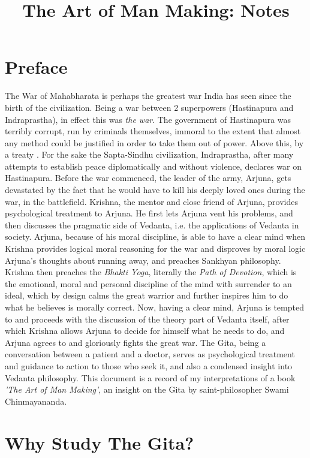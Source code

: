 \documentclass{article}
\title{The Art of Man Making: Notes}
\author{ }
\newcommand{\tit}[1]{\textit{#1}}
\begin{document}
\maketitle
\newpage \section*{Preface}
The War of Mahabharata is perhaps the greatest war India has seen since the birth of the civilization. Being a war between 2 superpowers (Hastinapura and Indraprastha), in effect this was \tit{the war}. The government of Hastinapura was terribly corrupt, run by criminals themselves, immoral to the extent that almost any method could be justified in order to take them out of power. Above this, by a treaty . For the sake the Sapta-Sindhu civilization, Indraprastha, after many attempts to establish peace diplomatically and without violence, declares war on Hastinapura. Before the war commenced, the leader of the army, Arjuna, gets devastated by the fact that he would have to kill his deeply loved ones during the war, in the battlefield. Krishna, the mentor and close friend of Arjuna, provides psychological treatment to Arjuna. He first lets Arjuna vent his problems, and then discusses the pragmatic side of Vedanta, i.e. the applications of Vedanta in society. Arjuna, because of his moral discipline, is able to have a clear mind when Krishna provides logical moral reasoning for the war and disproves by moral logic Arjuna's thoughts about running away, and preaches Sankhyan philosophy. Krishna then preaches the \tit{Bhakti Yoga}, literally the \tit{Path of Devotion}, which is the emotional, moral and personal discipline of the mind with surrender to an ideal, which by design calms the great warrior and further inspires him to do what he believes is morally correct. Now, having a clear mind, Arjuna is tempted to and proceeds with the discussion of the theory part of Vedanta itself, after which Krishna allows Arjuna to decide for himself what he needs to do, and Arjuna agrees to and gloriously fights the great war. The Gita, being a conversation between a patient and a doctor, serves as psychological treatment and guidance to action to those who seek it, and also a condensed insight into Vedanta philosophy. This document is a record of my interpretations of a book \tit{'The Art of Man Making'}, an insight on the Gita by saint-philosopher Swami Chinmayananda.
\newpage \section{Why Study The Gita?}
\end{document}
